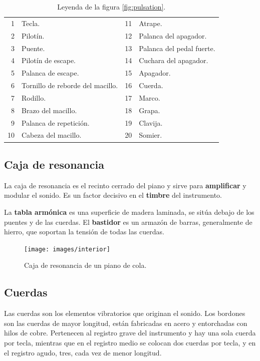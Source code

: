 \documentclass[10pt,a4paper]{article}
\begin{document}
	\begin{table}[!ht]
		\centering
		\begin{tabular}{|r|l||r|l|}
			\hline
			1 & Tecla. & 11 & Atrape. \\
			2 & Pilotín. & 12 & Palanca del apagador. \\
			3 & Puente. & 13 & Palanca del pedal fuerte. \\
			4 & Pilotín de escape. & 14 & Cuchara del apagador. \\
			5 & Palanca de escape. & 15 & Apagador. \\
			6 & Tornillo de reborde del macillo. & 16 & Cuerda. \\
			7 & Rodillo. & 17 & Marco. \\
			8 & Brazo del macillo. & 18 & Grapa. \\
			9 & Palanca de repetición. & 19 & Clavija. \\
			10 & Cabeza del macillo. & 20 & Somier. \\
			\hline
		\end{tabular}
		\caption[Leyenda del mecanismo]{\label{tab:pulsation} Leyenda de la figura \ref{fig:pulsation}.}
	\end{table}
	
	\subsection{Caja de resonancia}
	
	La caja de resonancia es el recinto cerrado del piano y sirve para \textbf
	{amplificar} y modular el sonido. Es un factor decisivo en el \textbf
	{timbre} del instrumento.
	
	La \textbf{tabla armónica} es una superficie de madera laminada, se sitúa 
	debajo de los puentes y de las cuerdas. El \textbf{bastidor} es un armazón 
	de barras, generalmente de hierro, que soportan la tensión de todas las 
	cuerdas.
	
	\begin{figure}[!ht]
		\centering
		\texttt{[image: images/interior]}
		\caption[Caja de resonancia]{\label{fig:interior} Caja de resonancia de un piano de cola. \cite{interior}}
	\end{figure}
	
	\subsection{Cuerdas}
	
	Las cuerdas son los elementos vibratorios que originan el sonido. Los 
	bordones son las cuerdas de mayor longitud, están fabricadas en acero y 
	entorchadas con hilos de cobre. Pertenecen al registro grave del 
	instrumento y hay una sola cuerda por tecla, mientras que en el registro 
	medio se colocan dos cuerdas por tecla, y en el registro agudo, tres, cada 
	vez de menor longitud.
	
\end{document}
